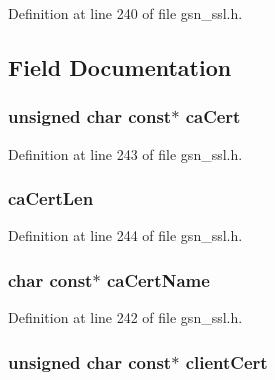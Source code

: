 Definition at line 240 of file gsn\_\-ssl.h.



\subsection{Field Documentation}
\hypertarget{a00242_ada71ec9e7be06c5f184a682d27888ae3}{
\subsubsection[{caCert}]{\setlength{\rightskip}{0pt plus 5cm}unsigned char const$\ast$ {\bf caCert}}}
\label{a00242_ada71ec9e7be06c5f184a682d27888ae3}


Definition at line 243 of file gsn\_\-ssl.h.

\hypertarget{a00242_a91a9fb29070a3ee80937f9e601dc2335}{
\subsubsection[{caCertLen}]{ {\bf caCertLen}}}
\label{a00242_a91a9fb29070a3ee80937f9e601dc2335}


Definition at line 244 of file gsn\_\-ssl.h.

\hypertarget{a00242_ab83658b0000e25e77ac261d971673a1e}{
\subsubsection[{caCertName}]{\setlength{\rightskip}{0pt plus 5cm}char const$\ast$ {\bf caCertName}}}
\label{a00242_ab83658b0000e25e77ac261d971673a1e}


Definition at line 242 of file gsn\_\-ssl.h.

\hypertarget{a00242_a33d2c57e30a54c929d9e40083385a04a}{
\subsubsection[{clientCert}]{\setlength{\rightskip}{0pt plus 5cm}unsigned char const$\ast$ {\bf clientCert}}}
\label{a00242_a33d2c57e30a54c929d9e40083385a04a}


